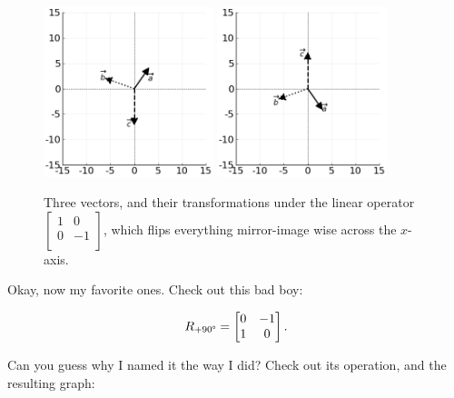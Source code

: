 \begin{figure}[hb]
\centering
\vspace{.2in}
\includegraphics[width=0.44\textwidth]{preoperators.png}
\includegraphics[width=0.44\textwidth]{vertFlipOp.png}
\caption[.]{Three vectors, and their transformations under the linear operator 
{\scriptsize $\begin{bmatrix} 1 & 0 \\ 0 & -1 \\
\end{bmatrix}$,} which flips everything mirror-image wise across the $x$-axis.}
\label{fig:vertFlipOp}
\end{figure}

\bigskip

Okay, now my favorite ones. Check out this bad boy:

\vspace{-.15in}
\begin{align*}
R_{+90\degree} =
\begin{bmatrix}
0 & -1 \\
1 & 0 \\
\end{bmatrix}.
\end{align*}
\vspace{-.15in}

Can you guess why I named it the way I did? Check out its operation, and the
resulting graph:


